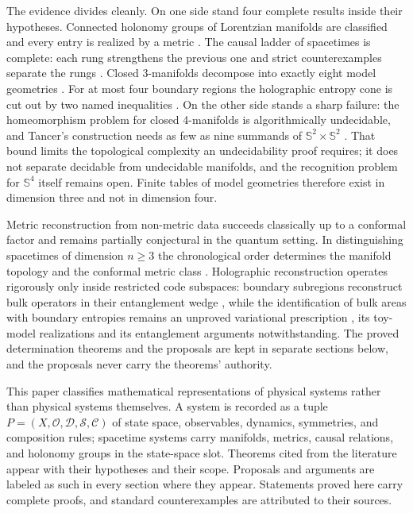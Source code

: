 \documentclass[11pt,letterpaper]{article}
\theoremstyle{definition}
\theoremstyle{remark}
\begin{document}
The evidence divides cleanly. On one side stand four complete results inside their hypotheses. Connected holonomy groups of Lorentzian manifolds are classified and every entry is realized by a metric \cite{galaev}. The causal ladder of spacetimes is complete: each rung strengthens the previous one and strict counterexamples separate the rungs \cite{minguzzisanchez}. Closed 3-manifolds decompose into exactly eight model geometries \cite{perelman,thurston1982}. For at most four boundary regions the holographic entropy cone is cut out by two named inequalities \cite{baoetal}. On the other side stands a sharp failure: the homeomorphism problem for closed 4-manifolds is algorithmically undecidable, and Tancer's construction needs as few as nine summands of $\mathbb{S}^2 \times \mathbb{S}^2$ \cite{tancer}. That bound limits the topological complexity an undecidability proof requires; it does not separate decidable from undecidable manifolds, and the recognition problem for $\mathbb{S}^4$ itself remains open. Finite tables of model geometries therefore exist in dimension three and not in dimension four.

Metric reconstruction from non-metric data succeeds classically up to a conformal factor and remains partially conjectural in the quantum setting. In distinguishing spacetimes of dimension $n \ge 3$ the chronological order determines the manifold topology and the conformal metric class \cite{malament,hkm}. Holographic reconstruction operates rigorously only inside restricted code subspaces: boundary subregions reconstruct bulk operators in their entanglement wedge \cite{dongharlowwall}, while the identification of bulk areas with boundary entropies remains an unproved variational prescription \cite{ryutakayanagi}, its toy-model realizations \cite{haappy} and its entanglement arguments \cite{vanraamsdonk} notwithstanding. The proved determination theorems and the proposals are kept in separate sections below, and the proposals never carry the theorems' authority.

This paper classifies mathematical representations of physical systems rather than physical systems themselves. A system is recorded as a tuple $P = (X, \mathcal{O}, \mathcal{D}, \mathcal{S}, \mathcal{C})$ of state space, observables, dynamics, symmetries, and composition rules; spacetime systems carry manifolds, metrics, causal relations, and holonomy groups in the state-space slot. Theorems cited from the literature appear with their hypotheses and their scope. Proposals and arguments are labeled as such in every section where they appear. Statements proved here carry complete proofs, and standard counterexamples are attributed to their sources.
\end{document}
